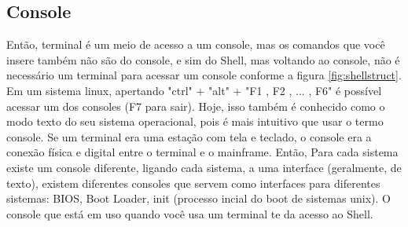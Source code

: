 \documentclass[oneside, 11 pt]{article}
\begin{document}
	\subsection{Console}
	Então, terminal é um meio de acesso a um console, mas os comandos que você insere também não são do console, e sim do Shell, mas voltando ao console, não é necessário um terminal para acessar um console conforme a figura \ref*{fig:shellstruct}. Em um sistema linux, apertando "ctrl" + "alt" + "F1 , F2 , ... , F6" é possível acessar um dos consoles (F7 para sair). Hoje, isso também é conhecido como o modo texto do seu sistema operacional, pois é mais intuitivo que usar o termo console. Se um terminal era uma estação com tela e teclado, o console era a conexão física e digital entre o terminal e o mainframe. Então, Para cada sistema existe um console diferente, ligando cada sistema, a uma interface (geralmente, de texto), existem diferentes consoles que servem como interfaces para diferentes sistemas: BIOS, Boot Loader, init (processo incial do boot de sistemas unix). O console que está em uso quando você usa um terminal te da acesso ao Shell.
\end{document}
